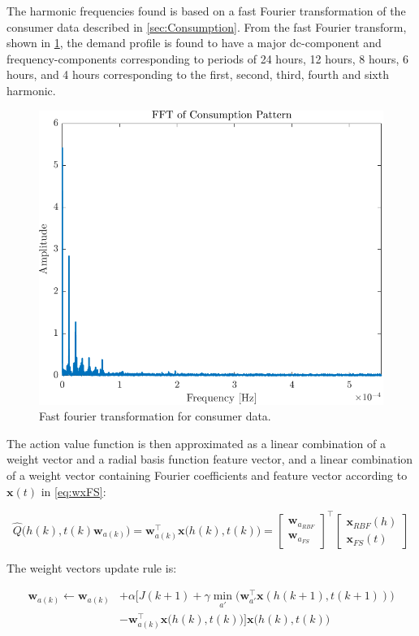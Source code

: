 The harmonic frequencies found is based on a fast Fourier transformation of the consumer data described in \cref{sec:Consumption}. From the fast Fourier transform, shown in \cref{fig:FFT}, the demand profile is found to have a major dc-component and frequency-components corresponding to periods of 24 hours, 12 hours, 8 hours, 6 hours, and 4 hours corresponding to the first, second, third, fourth and sixth harmonic. 
 
\clearpage
\begin{figure}[h!]
	\centering
	\includegraphics[width=0.7\linewidth]{Figures/FFT.pdf}
	\caption{Fast fourier transformation for consumer data.}
	\label{fig:FFT}
\end{figure} 

The action value function is then approximated as a linear combination of a weight vector and a radial basis function feature vector, and a linear combination of a weight vector containing Fourier coefficients and feature vector according to $ \textbf{x}(t) $ in \cref{eq:wxFS}:

\begin{equation}
	\hat{Q}\bigg(h(k),t(k)\textbf{w}_{a(k)}\bigg)=\textbf{w}_{a(k)}^{\intercal}\textbf{x}\bigg(h(k),t(k)\bigg)=
	\begin{bmatrix}
		\textbf{w}_{a_{RBF}}\\
		\textbf{w}_{a_{FS}}
	\end{bmatrix}^{\intercal}
	\begin{bmatrix}
		\textbf{x}_{RBF}(h)\\
		\textbf{x}_{FS}(t)
	\end{bmatrix}
\end{equation}

The weight vectors update rule is:

\begin{equation}
\begin{split}
	\textbf{w}_{a(k)} \leftarrow \textbf{w}_{a(k)}
	&+\alpha\bigg[J(k+1)+\gamma\min_{a'}\bigg(\textbf{w}_{a'}^{\intercal}\textbf{x}(h(k+1),t(k+1))\bigg)\\
	&-\textbf{w}_{a(k)}^{\intercal}\textbf{x}\bigg(h(k),t(k)\bigg)
	\bigg]\textbf{x}\bigg(h(k),t(k)\bigg)
\end{split}
\end{equation}

